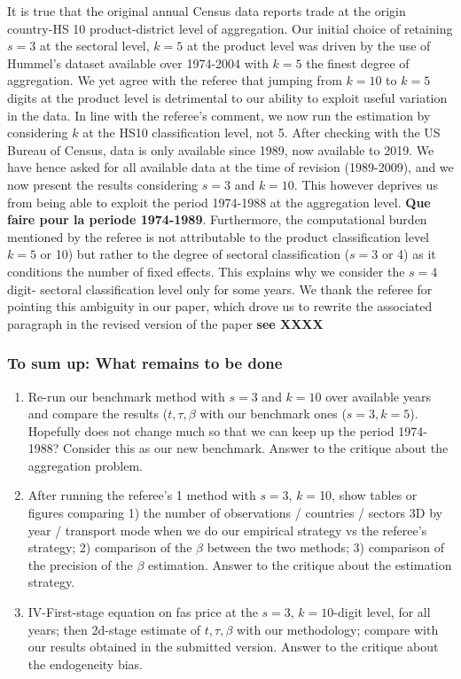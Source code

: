 \documentclass[a4paper,12pt]{article}
\begin{document}
It is true that the original annual Census data reports trade at the origin country-HS 10 product-district level of aggregation. Our initial choice of retaining $s=3$ at the sectoral level, $k=5$ at the product level was driven by the use of Hummel's dataset available over 1974-2004 with $k=5$ the finest degree of aggregation. We yet agree with the referee that jumping from $k=10$ to $k=5$ digits at the product level is detrimental to our ability to exploit useful variation in the data. In line with the referee's comment, we now run the estimation by considering $k$ at the HS10 classification level, not 5. After checking with the US Bureau of Census, data is only available since 1989, now available to 2019. We have hence asked for all available data at the time of revision (1989-2009), and we now present the results considering $s=3$ and $k=10$. This however deprives us from being able to exploit the period 1974-1988 at the aggregation level. \textbf{Que faire pour la periode 1974-1989}. Furthermore, the computational burden mentioned by the referee is not attributable to the product classification level $k=5$ or 10) but rather to the degree of sectoral classification ($s=3$ or 4) as it conditions the number of fixed effects. This explains why we consider the $s=4$ digit- sectoral classification level only for some years. We thank the referee for pointing this ambiguity in our paper, which drove us to rewrite the associated paragraph in the revised version of the paper \textbf{see XXXX}



\subsubsection{To sum up: What remains to be done}

\begin{enumerate}
\item\label{bp:3} Re-run our benchmark method with $s=3$ and $k=10$ over available years and compare the results ($t,\tau,\beta$ with our benchmark ones ($s=3,k=5$). Hopefully does not change much so that we can keep up the period 1974-1988? Consider this as our new benchmark. Answer to the critique about the aggregation problem.
\item\label{bp:1} After running the referee's 1 method with $s=3$, $k=$10, show tables or figures comparing 1) the number of observations / countries / sectors 3D by year / transport mode when we do our empirical strategy vs the referee's strategy; 2) comparison of the $\beta$ between the two methods; 3) comparison of the precision of the $\beta$ estimation. Answer to the critique about the estimation strategy.
\item\label{bp:2} IV-First-stage equation on fas price at the $s=3$, $k=10$-digit level, for all years; then 2d-stage estimate of $t,\tau, \beta$ with our methodology; compare with our results obtained in the submitted version. Answer to the critique about the endogeneity bias.
\end{enumerate}
\end{document}
